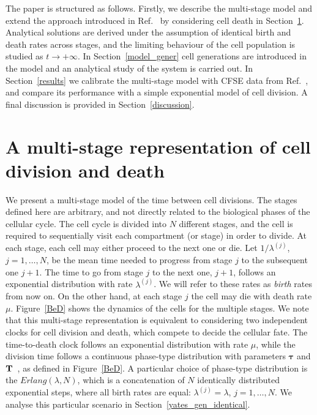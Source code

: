 \documentclass[10pt]{article}
\numberwithin{equation}{section}
\begin{document}
The paper is structured as follows. Firstly, we describe the multi-stage model and extend the approach introduced in Ref.~\cite{yates} by considering cell death in Section~\ref{model_bd}. Analytical solutions are derived under the assumption of identical birth and death rates across stages, and the limiting behaviour of the cell population is studied as $t \to + \infty$. In Section~\ref{model_gener} cell generations are introduced in the model and an analytical study of the system is carried out. In Section~\ref{results} we calibrate the multi-stage model with CFSE data from Ref.~\cite{hogan}, and compare its performance with a simple exponential model of cell division. A final discussion is provided in Section~\ref{discussion}.

\section{A multi-stage representation of cell division and death}
\label{model_bd}

We present a multi-stage model of the time between cell divisions. The stages defined here are arbitrary, and not directly related to the biological phases of the cellular cycle. The cell cycle is divided into $N$ different stages, and the cell is required to 
sequentially visit 
each  compartment (or stage) in order  to divide. At each stage, each cell may either proceed to the next one or die. Let $1/\lambda^{(j)}$, $j=1,\ldots,N$, be the mean time needed to progress from stage $j$ to the subsequent one $j+1$. The time to go from stage $j$ to the next one, $j+1$, follows an exponential distribution with rate $\lambda^{(j)}$. We will refer to these rates as {\it birth} rates from now on. On the other hand, at each stage $j$ the cell may die with death rate $\mu$. Figure~\ref{BeD} shows the dynamics of the cells for the multiple stages. We note that this multi-stage representation is equivalent to considering two independent clocks for cell division and death, which compete to decide 
the cellular fate. The time-to-death clock follows an exponential distribution with rate $\mu$, while the division time follows a continuous phase-type distribution with parameters $\boldsymbol{\tau}$ and ${\bf T}$~\cite{he}, as defined in Figure~\ref{BeD}. A particular choice of phase-type distribution is the $Erlang(\lambda,N)$, which is a concatenation of $N$ identically distributed exponential steps, where all birth rates are equal: $\lambda^{(j)}=\lambda$, $j=1,\ldots,N$. We analyse this particular scenario in Section~\ref{yates_gen_identical}.
\end{document}
